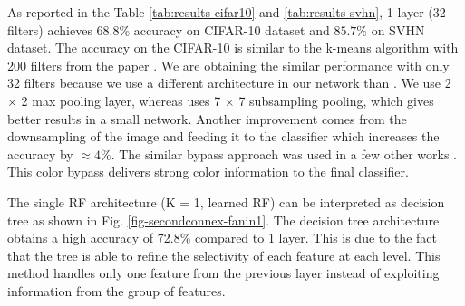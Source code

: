 \documentclass{article} %
\begin{document}
As reported in the Table \ref{tab:results-cifar10} and \ref{tab:results-svhn}, 1 layer (32 filters) achieves $68.8\%$ accuracy on CIFAR-10 dataset and $85.7\%$ on SVHN dataset.
The accuracy on the CIFAR-10 is similar to the k-means algorithm with 200 filters from the paper \cite{coates_analysis_2011}.
We are obtaining the similar performance with only 32 filters because we use a different architecture in our network than \cite{coates_analysis_2011}.
We use 2 $\times$ 2 max pooling layer, whereas \cite{coates_analysis_2011} uses 7 $\times$ 7 subsampling pooling, which gives better results in a small network.
Another improvement comes from the downsampling of the image and feeding it to the classifier which increases the accuracy by $\approx 4\%$.
The similar bypass approach was used in a few other works \cite{hinton2012dropout,coates_selecting_2011}. 
This color bypass delivers strong color information to the final classifier.

The single RF architecture (K = 1, learned RF) can be interpreted as decision tree as shown in Fig. \ref{fig-secondconnex-fanin1}.
The decision tree architecture obtains a high accuracy of 72.8\% compared to 1 layer. This is due to the fact that the tree is able to refine the selectivity of each feature at each level.
This method handles only one feature from the previous layer instead of exploiting information from the group of features.
\end{document}
